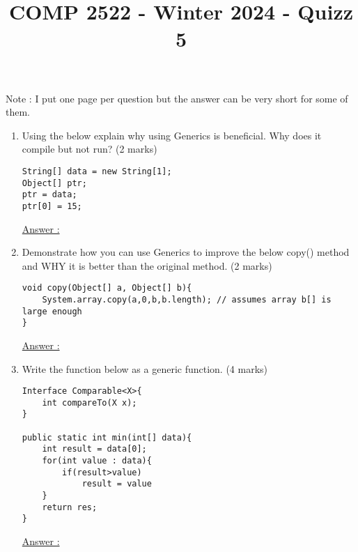 \documentclass{article}
\author{}
\date{}
\title{COMP 2522 - Winter 2024 - Quizz 5}
\begin{document}
\maketitle
Note : I put one page per question but the answer can be very short for some of them.
\begin{enumerate}
	\item Using the below explain why using Generics is beneficial. Why does it compile but not run? (2 marks)
	\begin{lstlisting}
String[] data = new String[1];
Object[] ptr;
ptr = data;
ptr[0] = 15;
	\end{lstlisting}
	\underline{Answer :}
	\newpage
	\item Demonstrate how you can use Generics to improve the below copy() method and WHY it is better than the original method. (2 marks)
	\begin{lstlisting}
void copy(Object[] a, Object[] b){
	System.array.copy(a,0,b,b.length); // assumes array b[] is large enough
}
	\end{lstlisting}
	\underline{Answer :}
	\newpage
	\item Write the function below as a generic function. (4 marks)
	\begin{lstlisting}
Interface Comparable<X>{
	int compareTo(X x);
}

public static int min(int[] data){
	int result = data[0];
	for(int value : data){
		if(result>value)
			result = value
	}
	return res;
}
	\end{lstlisting}
	\underline{Answer :}
\end{enumerate}
\end{document}
